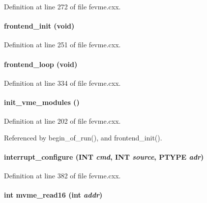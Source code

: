 Definition at line 272 of file fevme.cxx.
\paragraph[{frontend\_\-init}]{ frontend\_\-init (void)}\hfill\label{fevme_8cxx_a34c51ae8c88f4717087b0604975516f4}


Definition at line 251 of file fevme.cxx.
\paragraph[{frontend\_\-loop}]{ frontend\_\-loop (void)}\hfill\label{fevme_8cxx_ada66837c3c3d263974ad717921145e0a}


Definition at line 334 of file fevme.cxx.
\paragraph[{init\_\-vme\_\-modules}]{ init\_\-vme\_\-modules ()}\hfill\label{fevme_8cxx_a7bed189e5e4fef93d5f2290d1bf37980}


Definition at line 202 of file fevme.cxx.

Referenced by begin\_\-of\_\-run(), and frontend\_\-init().
\paragraph[{interrupt\_\-configure}]{ interrupt\_\-configure ({\bf INT} {\em cmd}, \/  {\bf INT} {\em source}, \/  PTYPE {\em adr})}\hfill\label{fevme_8cxx_a55dc1ffa15566edfd2ad2249aae97c77}


Definition at line 382 of file fevme.cxx.
\paragraph[{mvme\_\-read16}]{\setlength{\rightskip}{0pt plus 5cm}int mvme\_\-read16 (int {\em addr})}\hfill\label{fevme_8cxx_a5bb76dd83e38b109ec64f5a72f44a475}


